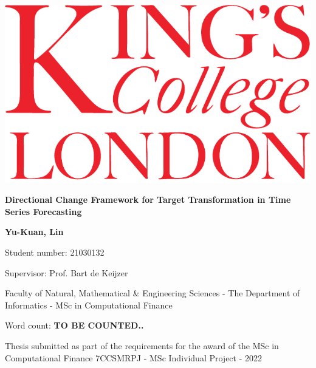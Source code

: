 \begin{titlepage}
    \begin{center}

        \includegraphics{./references/images/kcl-eps-converted-to.pdf}
        
        \vspace*{1cm}

        {\Huge \textbf{Directional Change Framework for Target Transformation in Time Series Forecasting}} \\
        
        \vspace*{1cm}

        \textbf{Yu-Kuan, Lin}
        
        Student number: 21030132
        
        Supervisor: Prof. Bart de Keijzer
        
        Faculty of Natural, Mathematical \& Engineering Sciences - The Department of Informatics - MSc in Computational Finance
        
        \vfill
        
        Word count: \textbf{TO BE COUNTED..}
        
        Thesis submitted as part of the requirements for the award of the MSc in Computational Finance 7CCSMRPJ - MSc Individual Project - 2022
        
    \end{center}
\end{titlepage}
